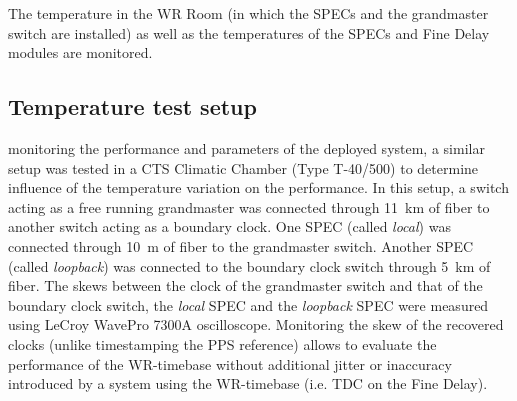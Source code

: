 

The temperature in the WR Room (in which the SPECs and the grandmaster switch are installed) as well
as the temperatures of the SPECs and Fine Delay modules are monitored. 



\subsection{Temperature test setup}
\label{sec:tempTestSetup}

 monitoring the performance and parameters of the deployed system, 
a similar setup was tested in a CTS Climatic Chamber (Type T-40/500) to determine influence 
of the temperature variation on the %
 performance. In this setup, a switch acting as a 
free running grandmaster was connected through 11~km of fiber to another switch acting as 
a boundary clock. One SPEC (called \textit{local}) was connected through 10~m of fiber to 
the grandmaster switch. Another SPEC (called \textit{loopback}) was connected to the boundary clock 
switch through 5~km of fiber.  The skews between the clock of the grandmaster switch and that of 
the boundary clock switch, the \textit{local} SPEC and the \textit{loopback} SPEC were measured using 
LeCroy WavePro 7300A oscilloscope. Monitoring the skew of the recovered clocks
(unlike \mbox{timestamping} the PPS reference) allows to evaluate the performance of the WR-timebase without
additional jitter or inaccuracy introduced by a system using the WR-timebase 
(i.e. TDC on the Fine Delay). 


